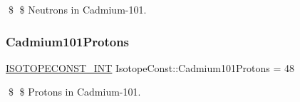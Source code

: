 \$ \$ Neutrons in Cadmium-\/101. \mbox{\label{group___isotope_const-_cadmium-_cd101_ga14a4682fecda7f9283c5d8509769aa85}} 
\subsubsection{\texorpdfstring{Cadmium101\+Protons}{Cadmium101Protons}}
{\footnotesize\ttfamily \mbox{\hyperlink{group___isotope_const-_macros_ga5f18360b3e99483a35c32d789e62621c}{I\+S\+O\+T\+O\+P\+E\+C\+O\+N\+S\+T\+\_\+\+I\+NT}} Isotope\+Const\+::\+Cadmium101\+Protons = 48}

\$ \$ Protons in Cadmium-\/101. 
